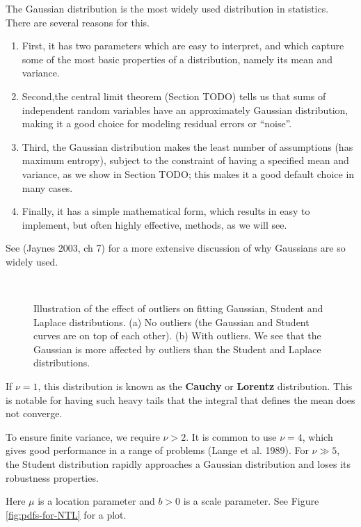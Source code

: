 \documentclass[8pt]{article}
\begin{document}
The Gaussian distribution is the most widely used distribution in statistics. There are several reasons for this. 
\begin{enumerate}
\item First, it has two parameters which are easy to interpret, and which capture some of the most basic properties of a distribution, namely its mean and variance. 
\item Second,the central limit theorem (Section TODO) tells us that sums of independent random variables have an approximately Gaussian distribution, making it a good choice for modeling residual errors or “noise”. 
\item Third, the Gaussian distribution makes the least number of assumptions (has maximum entropy), subject to the constraint of having a specified mean and variance, as we show in Section TODO; this makes it a good default choice in many cases. 
\item Finally, it has a simple mathematical form, which results in easy to implement, but often highly effective, methods, as we will see. 
\end{enumerate}
See (Jaynes 2003, ch 7) for a more extensive discussion of why Gaussians are so widely used.


\begin{figure}[hbtp]
\centering
{} \\
\caption{Illustration of the effect of outliers on fitting Gaussian, Student and Laplace distributions. (a) No outliers (the Gaussian and Student curves are on top of each other). (b) With outliers. We see that the Gaussian is more affected by outliers than the Student and Laplace distributions.}
\label{fig:robustness} 
\end{figure}

If $\nu=1$, this distribution is known as the \textbf{Cauchy} or \textbf{Lorentz} distribution. This is notable for having such heavy tails that the integral that defines the mean does not converge.

To ensure finite variance, we require $\nu>2$. It is common to use $\nu=4$, which gives good performance in a range of problems (Lange et al. 1989). For $\nu \gg 5$, the Student distribution rapidly approaches a Gaussian distribution and loses its robustness properties.


Here $\mu$ is a location parameter and $b>0$ is a scale parameter. See Figure \ref{fig:pdfs-for-NTL} for a plot.
\end{document}
